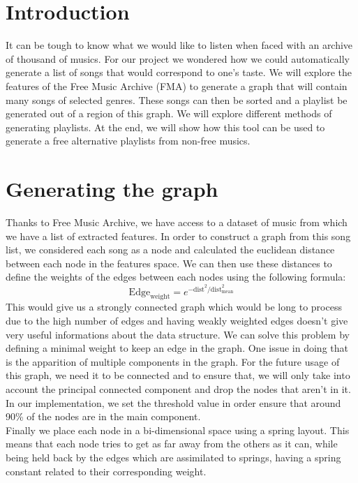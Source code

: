 \section{Introduction}
It can be tough to know what we would like to listen when faced with an archive of thousand of musics. For our project we wondered how we could automatically generate a list of songs that would correspond to one's taste. We will explore the features of the Free Music Archive (FMA) to generate a graph that will contain many songs of selected genres. These songs can then be sorted and a playlist be generated out of a region of this graph. We will explore different methods of generating playlists. At the end, 
we will show how this tool can be used to generate a free alternative playlists from non-free musics.

\section{Generating the graph}
Thanks to Free Music Archive, we have access to a dataset of music from which we have a list of extracted features. In order to construct a graph from this song list, we considered each song as a node and calculated the euclidean distance between each node in the features space. We can then use these distances to define the weights of the edges between each nodes using the following formula:
$$
\text{Edge}_{\text{weight}}=e^{-\text{dist}^2/\text{dist}_{\text{mean}}^2}
$$
This would give us a strongly connected graph which would be long to process due to the high number of edges and having weakly weighted edges doesn't give very useful informations about the data structure. We can solve this problem by defining a minimal weight to keep an edge in the graph. One issue in doing that is the apparition of multiple components in the graph. For the future usage of this graph, we need it to be connected and to ensure that, we will only take into account the principal connected component and drop the nodes that aren't in it. In our implementation, we set the threshold value in order ensure that around 90\% of the nodes are in the main component.\\

Finally we place each node in a bi-dimensional space using a spring layout. This means that each node tries to get as far away from the others as it can, while being held back by the edges which are assimilated to springs, having a spring constant related to their corresponding weight.\\

